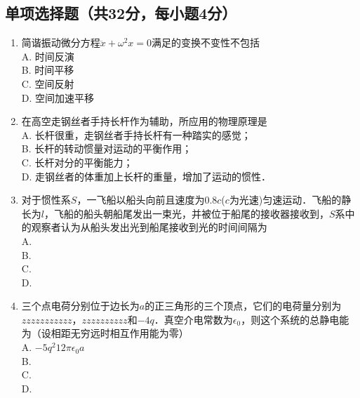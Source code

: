 
\begin{issues}
\issueDraft
\issueTODO
\end{issues}



\subsection{单项选择题（共32分，每小题4分）}
\begin{enumerate}
\item 简谐振动微分方程$\ddot{x}+{\omega}^2{x}=0$满足的变换不变性不包括\\
A. 时间反演\\
B. 时间平移\\
C. 空间反射\\
D. 空间加速平移\\

\item 在高空走钢丝者手持长杆作为辅助，所应用的物理原理是\\
A. 长杆很重，走钢丝者手持长杆有一种踏实的感觉；\\
B. 长杆的转动惯量对运动的平衡作用；\\
C. 长杆对分的平衡能力；\\
D. 走钢丝者的体重加上长杆的重量，增加了运动的惯性．\\

\item 对于惯性系$S$，一飞船以船头向前且速度为0.8$c$($c$为光速)匀速运动．飞船的静长为$l$，飞船的船头朝船尾发出一束光，并被位于船尾的接收器接收到，$S$系中的观察者认为从船头发出光到船尾接收到光的时间间隔为\\
A. \\
B. \\
C. \\
D. \\

\item 三个点电荷分别位于边长为$a$的正三角形的三个顶点，它们的电荷量分别为$zzzzzzzzzzz$，$zzzzzzzzzz$和$-4q$．真空介电常数为$\epsilon_{0}$，则这个系统的总静电能为（设相距无穷远时相互作用能为零）\\
A. $-5q^{2}12\pi \epsilon_{0} a$\\
B. \\
C. \\
D. \\
\end{enumerate}